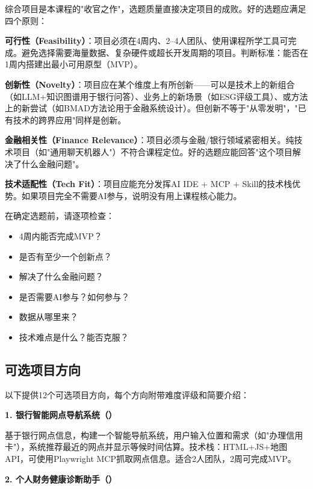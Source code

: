 综合项目是本课程的"收官之作"，选题质量直接决定项目的成败。好的选题应满足四个原则：

\textbf{可行性（Feasibility）}：项目必须在4周内、2--4人团队、使用课程所学工具可完成。避免选择需要海量数据、复杂硬件或超长开发周期的项目。判断标准：能否在1周内搭建出最小可用原型（MVP）。

\textbf{创新性（Novelty）}：项目应在某个维度上有所创新——可以是技术上的新组合（如LLM+知识图谱用于银行问答）、业务上的新场景（如ESG评级工具）、或方法上的新尝试（如BMAD方法论用于金融系统设计）。但创新不等于"从零发明"，"已有技术的跨界应用"同样是创新。

\textbf{金融相关性（Finance Relevance）}：项目必须与金融/银行领域紧密相关。纯技术项目（如"通用聊天机器人"）不符合课程定位。好的选题应能回答"这个项目解决了什么金融问题"。

\textbf{技术适配性（Tech Fit）}：项目应能充分发挥AI IDE + MCP + Skill的技术栈优势。如果项目完全不需要AI参与，说明没有用上课程核心能力。

\begin{notebox}[选题自查清单]
在确定选题前，请逐项检查：
\begin{itemize}[leftmargin=1em]
  \item [\checkmark] 4周内能否完成MVP？
  \item [\checkmark] 是否有至少一个创新点？
  \item [\checkmark] 解决了什么金融问题？
  \item [\checkmark] 是否需要AI参与？如何参与？
  \item [\checkmark] 数据从哪里来？
  \item [\checkmark] 技术难点是什么？能否克服？
\end{itemize}
\end{notebox}

\subsection{可选项目方向}

以下提供12个可选项目方向，每个方向附带难度评级和简要介绍：

\textbf{1. 银行智能网点导航系统（）}

基于银行网点信息，构建一个智能导航系统，用户输入位置和需求（如"办理信用卡"），系统推荐最近的网点并显示等候时间估算。技术栈：HTML+JS+地图API，可使用Playwright MCP抓取网点信息。适合2人团队，2周可完成MVP。

\textbf{2. 个人财务健康诊断助手（）}

